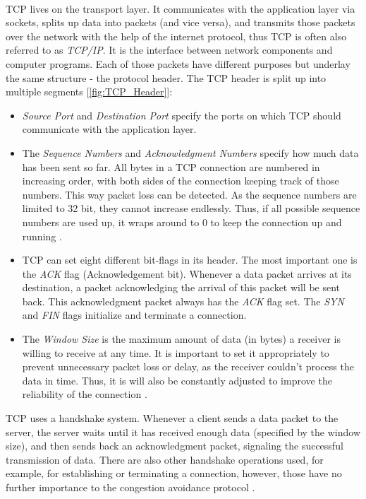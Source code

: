 \documentclass[a4paper,conference]{IEEEtran}
\begin{document}
\\TCP lives on the transport layer. It communicates with the application layer via sockets, splits up data into packets (and vice versa), and transmits those packets over the network with the help of the internet protocol, thus TCP is often also referred to as \textit{TCP/IP}. It is the interface between network components and computer programs. Each of those packets have different purposes but underlay the same structure - the protocol header. The TCP header is split up into multiple segments [\autoref{fig:TCP_Header}]:

\begin{itemize}
\item \textit{Source Port} and \textit{Destination Port} specify the ports on which TCP should communicate with the application layer.

\item The \textit{Sequence Numbers} and \textit{Acknowledgment Numbers} specify how much data has been sent so far. All bytes in a TCP connection are numbered in increasing order, with both sides of the connection keeping track of those numbers. This way packet loss can be detected. As the sequence numbers are limited to 32 bit, they cannot increase endlessly. Thus, if all possible sequence numbers are used up, it wraps around to 0 to keep the connection up and running \cite{postel1981transmission}.

\item TCP can set eight different bit-flags in its header. The most important one is the \textit{ACK} flag (Acknowledgement bit). Whenever a data packet arrives at its destination, a packet acknowledging the arrival of this packet will be sent back. This acknowledgment packet always has the \textit{ACK} flag set. The \textit{SYN} and \textit{FIN} flags initialize and terminate a connection.

\item The \textit{Window Size} is the maximum amount of data (in bytes) a receiver is willing to receive at any time. It is important to set it appropriately to prevent unnecessary packet loss or delay, as the receiver couldn't process the data in time. Thus, it is will also be constantly adjusted to improve the reliability of the connection \cite{jacobson1992tcp}.
\end{itemize}
TCP uses a handshake system. Whenever a client sends a data packet to the server, the server waits until it has received enough data (specified by the window size), and then sends back an acknowledgment packet, signaling the successful transmission of data. There are also other handshake operations used, for example, for establishing or terminating a connection, however, those have no further importance to the congestion avoidance protocol \cite{1209197,jacobson1992tcp,huston2000tcp,jacobson1995congestion}.
\end{document}
